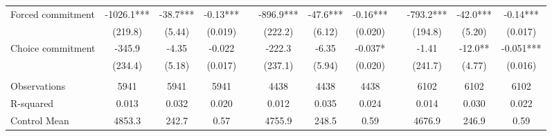\begin{tabular}{lccccccccccc}
\midrule
\midrule
Forced commitment & -1026.1*** & -38.7*** & -0.13*** &       & -896.9*** & -47.6*** & -0.16*** &       & -793.2*** & -42.0*** & -0.14*** \\
      & (219.8) & (5.44) & (0.019) &       & (222.2) & (6.12) & (0.020) &       & (194.8) & (5.20) & (0.017) \\
Choice commitment & -345.9 & -4.35 & -0.022 &       & -222.3 & -6.35 & -0.037* &       & -1.41 & -12.0** & -0.051*** \\
      & (234.4) & (5.18) & (0.017) &       & (237.1) & (5.94) & (0.020) &       & (241.7) & (4.77) & (0.016) \\
      &       &       &       &       &       &       &       &       &       &       &  \\
Observations & 5941  & 5941  & 5941  &       & 4438  & 4438  & 4438  &       & 6102  & 6102  & 6102 \\
R-squared & 0.013 & 0.032 & 0.020 &       & 0.012 & 0.035 & 0.024 &       & 0.014 & 0.030 & 0.022 \\
Control Mean & 4853.3 & 242.7 & 0.57  &       & 4755.9 & 248.5 & 0.59  &       & 4676.9 & 246.9 & 0.59 \\
\bottomrule
\bottomrule
\end{tabular}%
